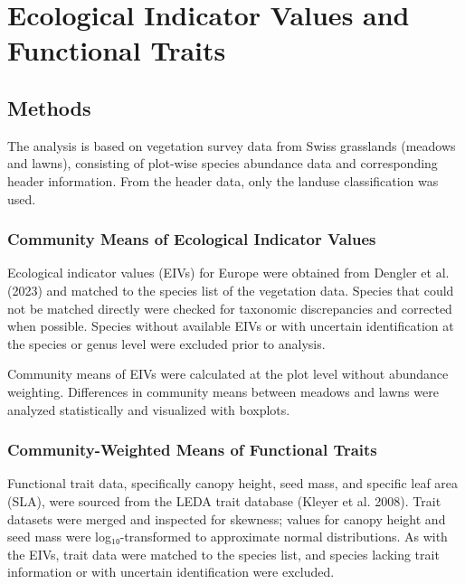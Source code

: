 \documentclass[
  12pt,
  a4paper,
  DIV=11,
  numbers=noendperiod]{scrartcl}
\author{}
\date{}
\begin{document}
\section{Ecological Indicator Values and Functional
Traits}\label{ecological-indicator-values-and-functional-traits}

\subsection{Methods}\label{methods}

The analysis is based on vegetation survey data from Swiss grasslands
(meadows and lawns), consisting of plot-wise species abundance data and
corresponding header information. From the header data, only the landuse
classification was used.

\subsubsection{Community Means of Ecological Indicator
Values}\label{community-means-of-ecological-indicator-values}

Ecological indicator values (EIVs) for Europe were obtained from Dengler
et al. (2023) and matched to the species list of the vegetation data.
Species that could not be matched directly were checked for taxonomic
discrepancies and corrected when possible. Species without available
EIVs or with uncertain identification at the species or genus level were
excluded prior to analysis.

Community means of EIVs were calculated at the plot level without
abundance weighting. Differences in community means between meadows and
lawns were analyzed statistically and visualized with boxplots.

\subsubsection{Community-Weighted Means of Functional
Traits}\label{community-weighted-means-of-functional-traits}

Functional trait data, specifically canopy height, seed mass, and
specific leaf area (SLA), were sourced from the LEDA trait database
(Kleyer et al. 2008). Trait datasets were merged and inspected for
skewness; values for canopy height and seed mass were log₁₀-transformed
to approximate normal distributions. As with the EIVs, trait data were
matched to the species list, and species lacking trait information or
with uncertain identification were excluded.
\end{document}
